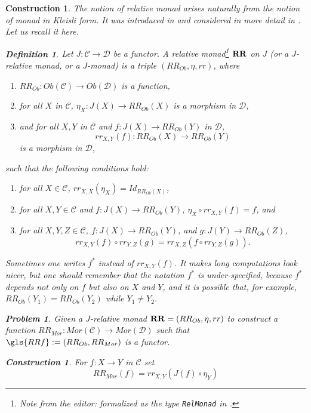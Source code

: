 \documentclass[onecolumn,12pt]{amsart}
\newtheorem{definition}[proposition]{Definition}
\numberwithin{proposition}{subsection}
\newtheorem{problem}[proposition]{Problem}
\newtheorem{construction}[proposition]{Construction}
\newcommand{\sr}{\rightarrow}
\newcommand{\RR}{{\bf RR}}
\newcommand{\C}{{\mathcal C}}
\newcommand{\D}{{\mathcal D}}
\newcommand{\editorfootnote}[1]{\footnote{Note from the editor: #1}}
\begin{document}
\begin{construction}
The notion of relative monad arises naturally from the notion of monad in Kleisli
form. It was introduced in \cite[Def.~1, p.~299]{ACU} and considered in more
detail in \cite{ACU2}. Let us recall it here.
%
\begin{definition}
\label{2015.12.22.def1}
Let $J:\C\sr \D$ be a functor. A {\em relative monad}\editorfootnote{formalized as the type {\tt RelMonad} in \cite{UniMath}.} $\RR$ on $J$ (or a $J$-relative monad, or a $J$-monad) is a triple $(RR_{Ob},\eta,rr)$, where
%
\begin{enumerate}
\item $RR_{Ob}:Ob(\C)\sr Ob(\D)$ is a function,
\item for all $X$ in $\C$, $\eta_{X}:J(X)\sr RR_{Ob}(X)$ is a morphism in $\D$,
\item and for all $X,Y$ in $\C$ and $f:J(X)\sr RR_{Ob}(Y)$ in $\D$,
%
$$rr_{X,Y}(f):RR_{Ob}(X)\sr RR_{Ob}(Y)$$
%
is a morphism in $\D$,
\end{enumerate}
%
such that the following conditions hold:
%
\begin{enumerate}[resume]
\item for all $X\in \C$, $rr_{X,X}(\eta_{X})=Id_{RR_{Ob}(X)}$,
\item for all $X,Y\in \C$ and $f:J(X)\sr RR_{Ob}(Y)$, $\eta_{X}\circ rr_{X,Y}(f)=f$, and
\item for all $X,Y,Z\in \C$, $f:J(X)\sr RR_{Ob}(Y)$, and $g:J(Y)\sr RR_{Ob}(Z)$, 
%
$$rr_{X,Y}(f)\circ rr_{Y,Z}(g)=rr_{X,Z}(f\circ rr_{Y,Z}(g)).$$
%
\end{enumerate}
\end{definition}
%
Sometimes one writes $f^*$ instead of $rr_{X,Y}(f)$. It makes long computations
look nicer, but one should remember that the notation $f^*$ is under-specified,
because $f^*$ depends not only on $f$ but also on $X$ and $Y$, and it is
possible that, for example, $RR_{Ob}(Y_1)=RR_{Ob}(Y_2)$ while $Y_1\ne Y_2$.
%
\begin{problem}\label{2016.01.15.prob1}
Given a $J$-relative monad $\RR=(RR_{Ob},\eta,rr)$ to construct a function
$RR_{Mor}:Mor(\C)\sr Mor(\D)$ such that $\gls{RRf} := (RR_{Ob},RR_{Mor})$ is a
functor.
\end{problem}
%
\begin{construction}\rm\label{2016.01.15.constr1}\rm
For $f:X\sr Y$ in $\C$ set
%
\begin{equation}\label{2017.04.05.eq3}
RR_{Mor}(f)=rr_{X,Y}(J(f)\circ \eta_{Y})

\end{equation}
\end{construction}
\end{construction}
\end{document}

